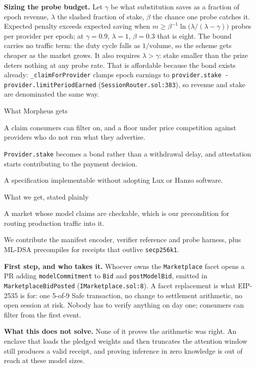 \documentclass[10pt,a4paper]{article}
\newcommand{\code}[1]{\texttt{\small #1}}
\begin{document}
\vspace{0.35ex}
\noindent\textbf{Sizing the probe budget.}
Let $\gamma$ be what substitution saves as a fraction of epoch revenue, $\lambda$
the slashed fraction of stake, $\beta$ the chance one probe catches it. Expected penalty exceeds expected saving when
$m \ge \beta^{-1}\ln\!\big(\lambda/(\lambda-\gamma)\big)$ probes per provider per
epoch; at $\gamma = 0.9$, $\lambda = 1$, $\beta = 0.3$ that is eight. The bound
carries no traffic term: the duty cycle falls as $1/\text{volume}$, so the scheme
gets cheaper as the market grows. It also requires $\lambda > \gamma$: stake
smaller than the prize deters nothing at any probe rate. That is affordable
because the bond exists already:
\code{\_claimForProvider} clamps epoch earnings to
\code{provider.stake - provider.limitPeriodEarned} (\code{SessionRouter.sol:383}),
so revenue and stake are denominated the same way.

\begin{stake}{What Morpheus gets}
  \item A claim consumers can filter on, and a floor under price competition
        against providers who do not run what they advertise.
  \item \code{Provider.stake} becomes a bond rather than a withdrawal delay, and
        attestation starts contributing to the payment decision.
  \item A specification implementable without adopting Lux or Hanzo software.
\end{stake}

\begin{stake}{What we get, stated plainly}
  \item A market whose model claims are checkable, which is our precondition for
        routing production traffic into it.
  \item We contribute the manifest encoder, verifier reference and probe harness,
        plus ML-DSA precompiles for receipts that outlive \code{secp256k1}.
\end{stake}

\noindent\textbf{First step, and who takes it.}
Whoever owns the \code{Marketplace} facet opens a PR adding
\code{modelCommitment} to \code{Bid} and \code{postModelBid}, emitted in
\code{MarketplaceBidPosted} (\code{IMarketplace.sol:8}). A facet replacement is
what EIP-2535 is for: one 5-of-9 Safe transaction, no change to settlement
arithmetic, no open session at risk. Nobody has to verify anything on day one;
consumers can filter from the first event.

\vspace{0.35ex}
\noindent\textbf{What this does not solve.}
None of it proves the arithmetic was right. An enclave that loads the pledged
weights and then truncates the attention window still produces a valid receipt,
and proving inference in zero knowledge is out of reach at these model sizes.

\vspace{0.6ex}
\end{document}
